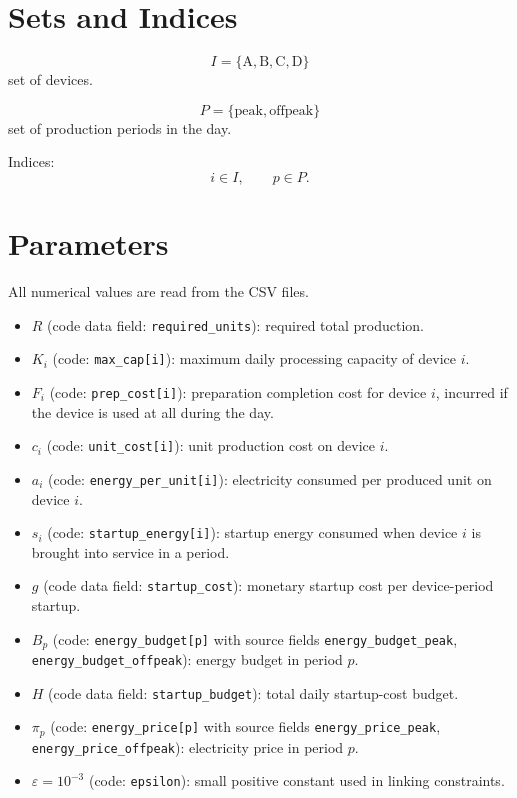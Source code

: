 \section*{Sets and Indices}

\[
I=\{\text{A},\text{B},\text{C},\text{D}\}
\]
set of devices.

\[
P=\{\text{peak},\text{offpeak}\}
\]
set of production periods in the day.

Indices:
\[
i \in I, \qquad p \in P.
\]

\section*{Parameters}

All numerical values are read from the CSV files.

\begin{itemize}
    \item \(R\) (code data field: \texttt{required\_units}): required total production.
    \item \(K_i\) (code: \texttt{max\_cap[i]}): maximum daily processing capacity of device \(i\).
    \item \(F_i\) (code: \texttt{prep\_cost[i]}): preparation completion cost for device \(i\), incurred if the device is used at all during the day.
    \item \(c_i\) (code: \texttt{unit\_cost[i]}): unit production cost on device \(i\).
    \item \(a_i\) (code: \texttt{energy\_per\_unit[i]}): electricity consumed per produced unit on device \(i\).
    \item \(s_i\) (code: \texttt{startup\_energy[i]}): startup energy consumed when device \(i\) is brought into service in a period.
    \item \(g\) (code data field: \texttt{startup\_cost}): monetary startup cost per device-period startup.
    \item \(B_p\) (code: \texttt{energy\_budget[p]} with source fields \texttt{energy\_budget\_peak}, \texttt{energy\_budget\_offpeak}): energy budget in period \(p\).
    \item \(H\) (code data field: \texttt{startup\_budget}): total daily startup-cost budget.
    \item \(\pi_p\) (code: \texttt{energy\_price[p]} with source fields \texttt{energy\_price\_peak}, \texttt{energy\_price\_offpeak}): electricity price in period \(p\).
    \item \(\varepsilon=10^{-3}\) (code: \texttt{epsilon}): small positive constant used in linking constraints.
\end{itemize}

